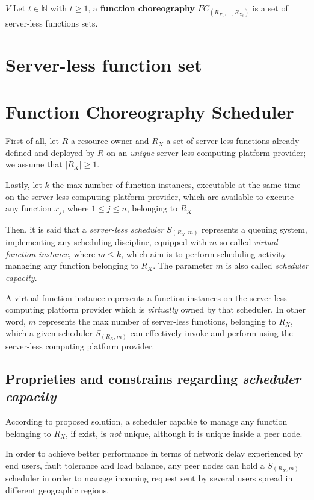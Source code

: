 \documentclass[10pt,a4paper]{article}
\begin{document}
 $V $
Let $t \in \mathbb{N}$ with $t \geq 1$, a \textbf{function choreography} $FC_{(R_{{X}_{1}}, \ldots,R_{{X}_{t}})}$ is a set of server-less functions sets. 




\section{Server-less function set}

\section{Function Choreography Scheduler}

First of all, let $R$ a resource owner and $R_{X}$ a set of server-less functions already defined and deployed by $R$ on an \textit{unique} server-less computing platform provider; we assume that $|R_{X}| \geq 1$.

Lastly, let $k$ the max number of function instances, executable at the same time on the server-less computing platform provider, which are available to execute any function $x_j$, where $1 \leq j \leq n$, belonging to $R_{X}$

Then, it is said that a \textit{server-less scheduler} $S_{({R_{X}},m)}$ represents a queuing system, implementing any scheduling discipline, equipped with $m$ so-called \textit{virtual function instance}, where $m \leq k$, which aim is to perform scheduling activity managing any function belonging to $R_{X}$. The parameter $m$ is also called \textit{scheduler capacity}.

A virtual function instance represents a function instances on the server-less computing platform provider which is \textit{virtually} owned by that scheduler. In other word, $m$ represents the max number of server-less functions, belonging to $R_{X}$, which a given scheduler $S_{({R_{X}},m)}$ can effectively invoke and perform using the server-less computing platform provider.


\subsection{Proprieties and constrains regarding \textit{scheduler capacity}}

According to proposed solution, a scheduler capable to manage any function belonging to $R_{X}$, if exist, is \textit{not} unique, although it is unique inside a peer node. 

In order to achieve better performance in terms of network delay experienced by end users, fault tolerance and load balance, any peer nodes can hold a $S_{({R_{X}},m)}$ scheduler in order to manage incoming request sent by several users spread in different geographic regions. 
\end{document}
